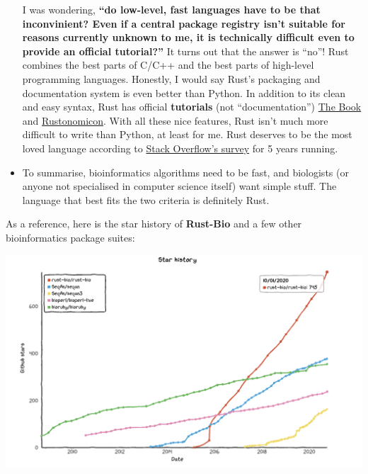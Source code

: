 \documentclass[
]{book}
\begin{document}
\begin{itemize}
  I was wondering, \textbf{``do low-level, fast languages have to be that inconvinient? Even if a central package registry isn't suitable for reasons currently unknown to me, it is technically difficult even to provide an official tutorial?''} It turns out that the answer is ``no''! Rust combines the best parts of C/C++ and the best parts of high-level programming languages. Honestly, I would say Rust's packaging and documentation system is even better than Python. In addition to its clean and easy syntax, Rust has official \textbf{tutorials} (not ``documentation'') \href{https://doc.rust-lang.org/book/}{The Book} and \href{https://doc.rust-lang.org/nomicon/}{Rustonomicon}. With all these nice features, Rust isn't much more difficult to write than Python, at least for me. Rust deserves to be the most loved language according to \href{https://insights.stackoverflow.com/survey/2020\#technology-most-loved-dreaded-and-wanted-languages-loved}{Stack Overflow's survey} for 5 years running.
\item
  To summarise, bioinformatics algorithms need to be fast, and biologists (or anyone not specialised in computer science itself) want simple stuff. The language that best fits the two criteria is definitely Rust.
\end{itemize}

As a reference, here is the star history of \textbf{Rust-Bio} and a few other bioinformatics package suites:

\includegraphics[width=1\linewidth]{img/star-history-2020-10}

  
\end{document}
